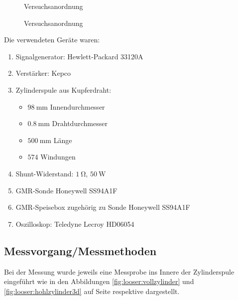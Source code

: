 \begin{figure}[!htb]
    \resizebox{\textwidth}{!}{}
    \caption{Versuchsanordnung}
    \label{fig:versuch:1}
\end{figure}
\begin{figure}[!htb]
    \resizebox{\textwidth}{!}{}
    \caption{Versuchsanordnung}
    \label{fig:versuch:2}
\end{figure}

Die verwendeten Ger\"ate waren:
\begin{enumerate}
    \item
        Signalgenerator: Hewlett-Packard 33120A
    \item
        Verst\"arker: Kepco
    \item
        Zylinderspule aus Kupferdraht:
        \begin{itemize}
            \item
               $\SI{98}{\milli\meter}$ Innendurchmesser
           \item
               $\SI{0.8}{\milli\meter}$ Drahtdurchmesser
           \item
               $\SI{500}{\milli\meter}$ L\"ange
           \item
               $\num{574}$ Windungen
        \end{itemize}
    \item
        Shunt-Widerstand: $\SI{1}{\ohm}$, $\SI{50}{\watt}$
    \item
        GMR-Sonde Honeywell SS94A1F
    \item
        GMR-Speisebox zugeh\"orig zu Sonde Honeywell SS94A1F
    \item
        Oszilloskop: Teledyne Lecroy HD06054
\end{enumerate}


\clearpage
\subsection{Messvorgang/Messmethoden}
\label{sec:durchf:subsec:messmethoden}


Bei  der Messung  wurde jeweils  eine Messprobe  ins Innere  der Zylinderspule
eingef\"uhrt   wie  in   den  Abbildungen   \ref{fig:looser:vollzylinder}  und
\ref{fig:looser:hohlzylinder3d}  auf  Seite  \pageref{fig:looser:vollzylinder}
respektive \pageref{fig:looser:hohlzylinder3d} dargestellt.

